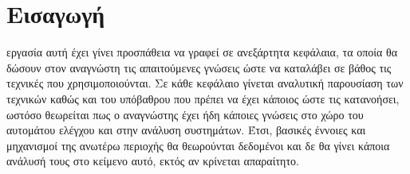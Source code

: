 
\chapter*{Εισαγωγή}
\lettrine[findent=2pt]{}{} εργασία αυτή έχει γίνει προσπάθεια να γραφεί σε ανεξάρτητα κεφάλαια, τα οποία θα δώσουν στον αναγνώστη τις απαιτούμενες γνώσεις ώστε να καταλάβει σε βάθος τις τεχνικές που χρησιμοποιούνται. Σε κάθε κεφάλαιο γίνεται αναλυτική παρουσίαση των τεχνικών καθώς και του υπόβαθρου που πρέπει να έχει κάποιος ώστε τις κατανοήσει, ωστόσο θεωρείται πως ο αναγνώστης έχει ήδη κάποιες γνώσεις στο χώρο του αυτομάτου ελέγχου και στην ανάλυση συστημάτων. Έτσι, βασικές έννοιες και μηχανισμοί της ανωτέρω περιοχής θα θεωρούνται δεδομένοι και δε θα γίνει κάποια ανάλυσή τους στο κείμενο αυτό, εκτός αν κρίνεται απαραίτητο.
